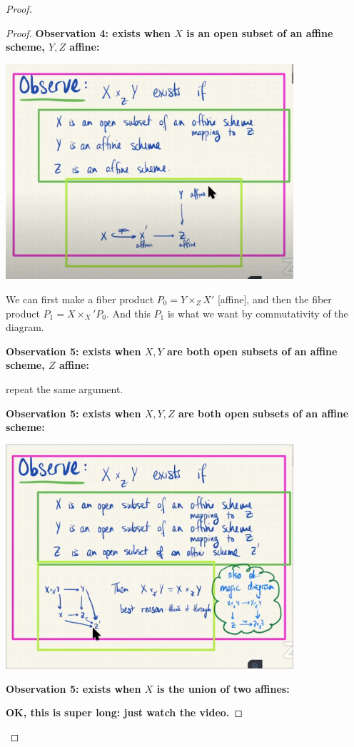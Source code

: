 \documentclass{book}
\theoremstyle{definition}
\begin{document}
\begin{proof}
\begin{proof}
\textbf{Observation 4: exists when $X$ is an open subset of an affine scheme, $Y, Z$ affine:}

\includegraphics[width=0.8\textwidth]{fibered-products-exist-4.png}

We can first make a fiber product  $P_0 = Y \times_Z X'$ [affine], and then
the fiber product $P_1 = X \times_X' P_0$. And this $P_1$ is what we want
by commutativity of the diagram.

\textbf{Observation 5: exists when $X, Y$ are both open subsets of an affine scheme, $Z$ affine:}

repeat the same argument.


\textbf{Observation 5: exists when $X, Y, Z$ are both open subsets of an affine scheme:}

\includegraphics[width=0.8\textwidth]{fibered-products-exist-5.png}


\textbf{Observation 5: exists when $X$ is the union of two affines:}


\textbf{OK, this is super long: just watch the video.}
\end{proof}


\end{proof}
\end{document}
